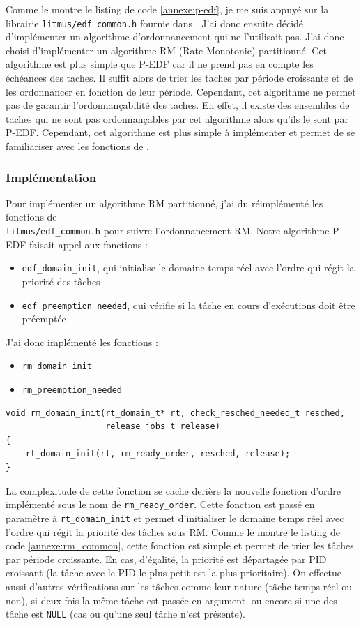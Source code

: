 Comme le montre le listing de code \ref{annexe:p-edf}, je me suis appuyé sur la librairie \texttt{litmus/edf\_common.h} fournie dans \litmus. J'ai donc ensuite décidé d'implémenter un algorithme d'ordonnancement qui ne l'utilisait pas. J'ai donc choisi d'implémenter un algorithme RM (Rate Monotonic) partitionné. Cet algorithme est plus simple que P-EDF car il ne prend pas en compte les échéances des taches. Il suffit alors de trier les taches par période croissante et de les ordonnancer en fonction de leur période. Cependant, cet algorithme ne permet pas de garantir l'ordonnançabilité des taches. En effet, il existe des ensembles de taches qui ne sont pas ordonnançables par cet algorithme alors qu'ils le sont par P-EDF. Cependant, cet algorithme est plus simple à implémenter et permet de se familiariser avec les fonctions de \litmus.


\subsubsection{Implémentation}

Pour implémenter un algorithme RM partitionné, j'ai du réimplémenté les fonctions de \\ \texttt{litmus/edf\_common.h} pour suivre l'ordonnancement RM. Notre algorithme P-EDF faisait appel aux fonctions :
\begin{itemize}
    \item \texttt{edf\_domain\_init}, qui initialise le domaine temps réel avec l'ordre qui régit la priorité des tâches
    \item \texttt{edf\_preemption\_needed}, qui vérifie si la tâche en cours d'exécutions doit être préemptée
\end{itemize}
J'ai donc implémenté les fonctions :
\begin{itemize}
    \item \texttt{rm\_domain\_init}
    \item \texttt{rm\_preemption\_needed}
\end{itemize}

\begin{lstlisting}[style=cstyle, caption={Fonction \texttt{rm\_domain\_init}}, label={annexe:rm_domain_init}]
void rm_domain_init(rt_domain_t* rt, check_resched_needed_t resched,
					release_jobs_t release)
{
	rt_domain_init(rt, rm_ready_order, resched, release);
}
\end{lstlisting}

La complexitude de cette fonction se cache derière la nouvelle fonction d'ordre implémenté sous le nom de \texttt{rm\_ready\_order}. Cette fonction est passé en paramètre à \texttt{rt\_domain\_init} et permet d'initialiser le domaine temps réel avec l'ordre qui régit la priorité des tâches sous RM. Comme le montre le listing de code \ref{annexe:rm_common}, cette fonction est simple et permet de trier les tâches par période croissante. En cas, d'égalité, la priorité est départagée par PID croissant (la tâche avec le PID le plus petit est la plus prioritaire). On effectue aussi d'autres vérifications sur les tâches comme leur nature (tâche temps réel ou non), si deux fois la même tâche est passée en argument, ou encore si une des tâche est \texttt{NULL} (cas ou qu'une seul tâche n'est présente).

